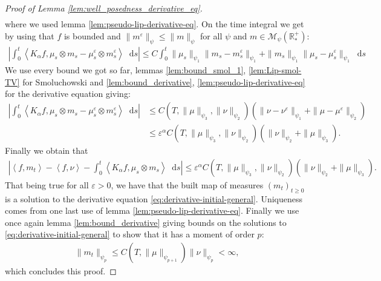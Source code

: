 \documentclass[11pt,a4paper]{article}
\newcommand{\RRP}{\mathbb{R}^+_*}
\newcommand{\MC}{\mathcal{M}}
\newcommand{\Proc}[1]{\left(#1\right)_{t\geq 0}}
\newcommand{\brac}[1]{\left\langle#1\right\rangle}
\newcommand{\dd}{\mathop{}\!\mathrm{d}}
\begin{document}
\begin{proof}[Proof of Lemma \ref{lem:well_posedness_derivative_eq}]
\begin{align*}
    \end{align*}
    where we used lemma \ref{lem:pseudo-lip-derivative-eq}. On the time integral we get by using that $f$ is bounded and $\|m^\varepsilon\|_{\psi} \leq \|m\|_\psi$ for all $\psi$ and $m \in \MC_{\psi}(\RRP)$:
    \begin{align*}
        \left|\int_0^t \brac{K_\alpha f,\mu_s \otimes m_s - \mu^\varepsilon_s \otimes m^\varepsilon_s} \dd s\right| 
        \leq C\int_0^t \|\mu_s\|_{\psi_1} \|m_s - m_s^\varepsilon\|_{\psi_1}+ \|m_s\|_{\psi_1} \|\mu_s - \mu_s^\varepsilon\|_{\psi_1}\dd s 
    \end{align*}
    We use every bound we got so far, lemmas \ref{lem:bound_smol_1}, \ref{lem:Lip-smol-TV} for Smoluchowski and \ref{lem:bound_derivative}, \ref{lem:pseudo-lip-derivative-eq} for the derivative equation giving:
    \begin{align*}
        \left|\int_0^t \brac{K_\alpha f,\mu_s \otimes m_s - \mu^\varepsilon_s \otimes m^\varepsilon_s} \dd s\right| 
        &\leq C(T,\|\mu\|_{\psi_3},\|\nu\|_{\psi_2})\left(\| \nu - \nu^\varepsilon\|_{\psi_1} + \| \mu - \mu^\varepsilon\|_{\psi_2}\right)\\
        &\leq \varepsilon^\alpha C(T,\|\mu\|_{\psi_3},\|\nu\|_{\psi_2})\left(\| \nu \|_{\psi_2} + \| \mu \|_{\psi_3}\right).
    \end{align*}
    Finally we obtain that 
    \begin{align*}
        \left| \brac{f,m_t} - \brac{f,\nu} - \int_0^t \brac{K_\alpha f,\mu_s \otimes m_s} \dd s\right| \leq \varepsilon^\alpha C(T,\|\mu\|_{\psi_3},\|\nu\|_{\psi_2})\left(\| \nu \|_{\psi_2} + \| \mu \|_{\psi_3}\right).
    \end{align*}
    That being true for all $\varepsilon > 0$, we have that the built map of measures $\Proc{m_t}$ is a solution to the derivative equation \eqref{eq:derivative-initial-general}. Uniqueness comes from one last use of lemma \ref{lem:pseudo-lip-derivative-eq}. Finally we use once again lemma \ref{lem:bound_derivative} giving bounds on the solutions to \eqref{eq:derivative-initial-general} to show that it has a moment of order $p$:
    \begin{align*}
        \| m_t \|_{\psi_p} \leq C(T,\|\mu\|_{\psi_{p+1}})\|\nu\|_{\psi_p} < \infty,
    \end{align*}
    which concludes this proof.
\end{proof}
\end{document}

